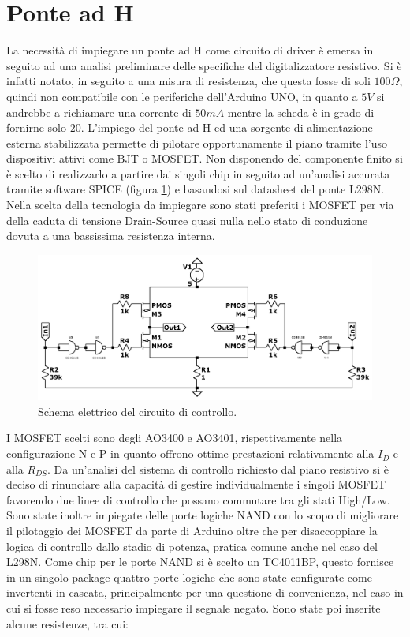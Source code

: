 \documentclass[12pt,twoside,openright]{report}
\begin{document}
\section{Ponte ad H}\label{hbridge}
La necessità di impiegare un ponte ad H come circuito di driver è emersa in seguito ad una analisi preliminare delle specifiche del digitalizzatore resistivo. Si è infatti notato, in seguito a una misura di resistenza, che questa fosse di soli $100 \Omega$, quindi non compatibile con le periferiche dell'Arduino UNO, in quanto a $5V$ si andrebbe a richiamare una corrente di $50mA$ mentre la scheda è in grado di fornirne solo $20$. L'impiego del ponte ad H ed una sorgente di alimentazione esterna stabilizzata permette di pilotare opportunamente il piano tramite l'uso dispositivi attivi come BJT o MOSFET. Non disponendo del componente finito si è scelto di realizzarlo a partire dai singoli chip in seguito ad un'analisi accurata tramite software SPICE (figura \ref{fig:controllo}) e basandosi sul datasheet del ponte L298N\cite{l298n}. Nella scelta della tecnologia da impiegare sono stati preferiti i MOSFET per via della caduta di tensione Drain-Source quasi nulla nello stato di conduzione dovuta a una bassissima resistenza interna. 
\begin{figure}[h!]
\centering
\includegraphics[width=\textwidth]{circuit3.png}
\caption{Schema elettrico del circuito di controllo.} \label{fig:controllo}
\end{figure}
I MOSFET scelti sono degli AO3400 e AO3401, rispettivamente nella configurazione N e P in quanto offrono ottime prestazioni relativamente alla $I_D$ e alla $R_{DS}$\cite{ao3400}\cite{ao3401}. Da un'analisi del sistema di controllo richiesto dal piano resistivo si è deciso di rinunciare alla capacità di gestire individualmente i singoli MOSFET favorendo due linee di controllo che possano commutare tra gli stati High/Low. Sono state inoltre impiegate delle porte logiche NAND con lo scopo di migliorare il pilotaggio dei MOSFET da parte di Arduino oltre che per disaccoppiare la logica di controllo dallo stadio di potenza, pratica comune anche nel caso del L298N. Come chip per le porte NAND si è scelto un TC4011BP, questo fornisce in un singolo package quattro porte logiche che sono state configurate come invertenti in cascata, principalmente per una questione di convenienza, nel caso in cui si fosse reso necessario impiegare il segnale negato\cite{TC4011BP}. Sono state poi inserite alcune resistenze, tra cui: 
\end{document}
